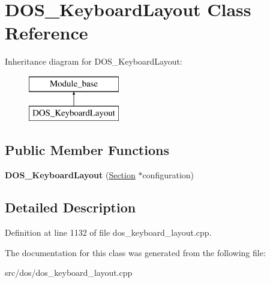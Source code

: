 \hypertarget{classDOS__KeyboardLayout}{\section{D\-O\-S\-\_\-\-Keyboard\-Layout Class Reference}
\label{classDOS__KeyboardLayout}
}
Inheritance diagram for D\-O\-S\-\_\-\-Keyboard\-Layout\-:\begin{figure}[H]
\begin{center}
\leavevmode
\includegraphics[height=2.000000cm]{classDOS__KeyboardLayout}
\end{center}
\end{figure}
\subsection*{Public Member Functions}
\begin{DoxyCompactItemize}
\item 
\hypertarget{classDOS__KeyboardLayout_a794faca95d191a599d107822832a037d}{{\bfseries D\-O\-S\-\_\-\-Keyboard\-Layout} (\hyperlink{classSection}{Section} $\ast$configuration)}\label{classDOS__KeyboardLayout_a794faca95d191a599d107822832a037d}

\end{DoxyCompactItemize}


\subsection{Detailed Description}


Definition at line 1132 of file dos\-\_\-keyboard\-\_\-layout.\-cpp.



The documentation for this class was generated from the following file\-:\begin{DoxyCompactItemize}
\item 
src/dos/dos\-\_\-keyboard\-\_\-layout.\-cpp\end{DoxyCompactItemize}
